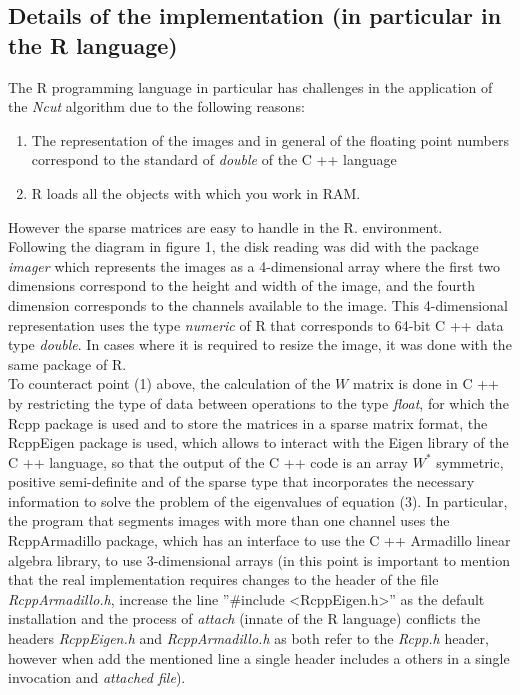 \documentclass[conference]{IEEEtran}
\theoremstyle{definition}
\begin{document}
\subsection{Details of the implementation (in particular in the R language)}
The R programming language in particular has challenges in the application of the \textit{Ncut} algorithm due to the following reasons:
\begin{enumerate}
\item The representation of the images and in general of the floating point numbers correspond to the standard of \textit {double} of the C ++ language
\item R loads all the objects with which you work in RAM.
\end{enumerate}
However the sparse matrices are easy to handle in the R. environment.\\
Following the diagram in figure 1, the disk reading was did with the package \textit{imager} \cite{imager} which represents the images as a 4-dimensional array where the first two dimensions correspond to the height and width of the image, and the fourth dimension corresponds to the channels available to the image. This 4-dimensional representation uses the type \textit{numeric} of R that corresponds to 64-bit C ++ data type \textit{double}. In cases where it is required to resize the image, it was done with the same package of R. \\
To counteract point (1) above, the calculation of the $ W $ matrix is done in C ++ by restricting the type of data between operations to the type \textit{float}, for which the Rcpp \cite{Rcpp} package is used and to store the matrices in a sparse matrix format, the RcppEigen \cite{RcppEigen} package is used, which allows to interact with the Eigen library of the C ++ language, so that the output of the C ++ code is an array $ W ^ * $ symmetric, positive semi-definite and of the sparse type that incorporates the necessary information to solve the problem of the eigenvalues of equation (3).
In particular, the program that segments images with more than one channel uses the RcppArmadillo \cite{RcppArmadillo} package, which has an interface to use the C ++ Armadillo linear algebra library, to use 3-dimensional arrays (in this point is important to mention that the real implementation requires changes to the header of the file \textit{RcppArmadillo.h}, increase the line ''\#include <RcppEigen.h>'' as the default installation and the process of \textit {attach} (innate of the R language) conflicts the headers \textit {RcppEigen.h} and \textit {RcppArmadillo.h} as both refer to the \textit {Rcpp.h} header, however when add the mentioned line a single header includes a others in a single invocation and \textit {attached file}). \\
\end{document}
